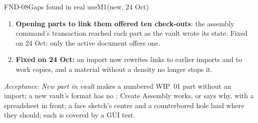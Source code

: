 \begin{epic}{FND-08}{Gaps found in real use}{M1}{\stTodo}{(new, 24 Oct)}
\begin{enumerate}[nosep]
  \item \textbf{Opening parts to link them offered ten check-outs}: the assembly command's transaction reached each
        part as the vault wrote its state. Fixed on 24 Oct: only the active document offers one.
  \item \textbf{Fixed on 24 Oct:} an import now rewrites links to earlier imports and to work copies, and a
        material without a density no longer stops it.
\end{enumerate}
\emph{Acceptance:} \emph{New part in vault} makes a numbered WIP~01 part without an import; a new vault's format has
no ; Create Assembly works, or says why, with a spreadsheet in front; a face sketch's centre and a
counterbored hole land where they should; each is covered by a GUI test.
\end{epic}
